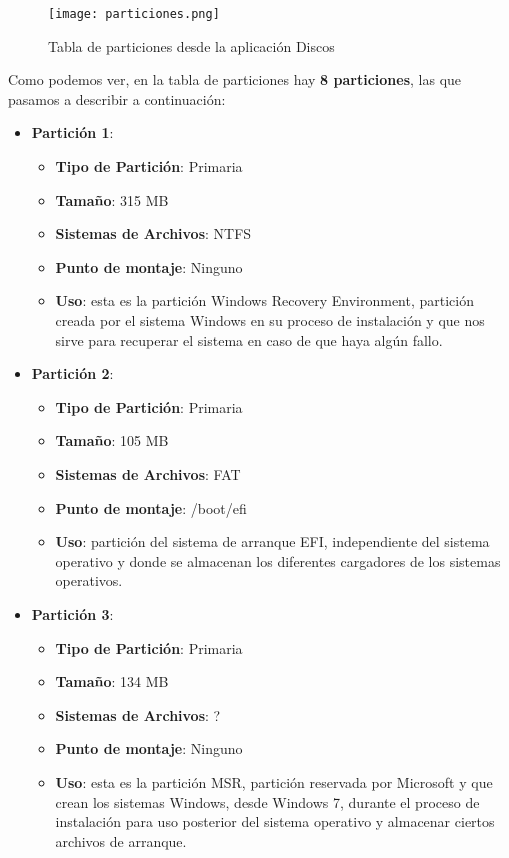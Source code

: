 \begin{figure}[H]
    \centering
    \texttt{[image: particiones.png]}
    \caption{Tabla de particiones desde la aplicación Discos}
\end{figure}

Como podemos ver, en la tabla de particiones hay \textbf{8 particiones}, las que pasamos a describir a continuación:

 \begin{itemize}
    \item \textbf{Partición 1}:
    \begin{itemize}
        \item \textbf{Tipo de Partición}: Primaria
        \item \textbf{Tamaño}: 315 MB
        \item \textbf{Sistemas de Archivos}: NTFS
        \item \textbf{Punto de montaje}: Ninguno
        \item \textbf{Uso}: esta es la partición Windows Recovery Environment, partición creada por el sistema Windows en su proceso de instalación y que nos sirve para recuperar el sistema en caso de que haya algún fallo.
    \end{itemize}

        \item \textbf{Partición 2}:
        \begin{itemize}
            \item \textbf{Tipo de Partición}: Primaria
            \item \textbf{Tamaño}: 105 MB
            \item \textbf{Sistemas de Archivos}: FAT
            \item \textbf{Punto de montaje}: /boot/efi
            \item \textbf{Uso}: partición del sistema de arranque EFI, independiente del sistema operativo y donde se almacenan los diferentes cargadores de los sistemas operativos.
        \end{itemize}

    \item \textbf{Partición 3}:
    \begin{itemize}
        \item \textbf{Tipo de Partición}: Primaria
        \item \textbf{Tamaño}: 134 MB
        \item \textbf{Sistemas de Archivos}: ?
        \item \textbf{Punto de montaje}: Ninguno
        \item \textbf{Uso}: esta es la partición MSR, partición reservada por Microsoft y que crean los sistemas Windows, desde Windows 7, durante el proceso de instalación
        para uso posterior del sistema operativo y almacenar ciertos archivos de arranque.
    \end{itemize}


\end{itemize}
